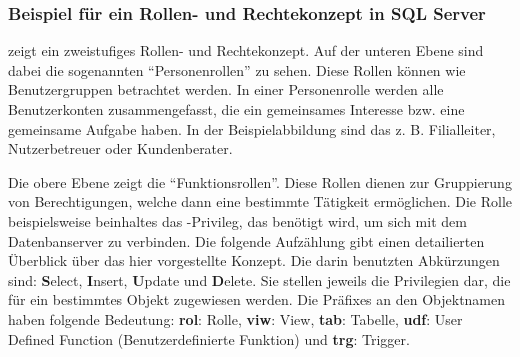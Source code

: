         \subsubsection{Beispiel für ein Rollen- und Rechtekonzept in SQL Server}
           zeigt ein zweistufiges Rollen- und
          Rechtekonzept. Auf der unteren Ebene sind dabei die sogenannten
          \enquote{Personenrollen} zu sehen. Diese Rollen können wie
          Benutzergruppen betrachtet werden. In einer Personenrolle werden alle
          Benutzerkonten zusammengefasst, die ein gemeinsames Interesse bzw.
          eine gemeinsame Aufgabe haben. In der Beispielabbildung sind das z. B.
          Filialleiter, Nutzerbetreuer oder Kundenberater.
          
          Die obere Ebene zeigt die \enquote{Funktionsrollen}. Diese Rollen
          dienen zur Gruppierung von Berechtigungen, welche dann eine bestimmte
          Tätigkeit ermöglichen. Die Rolle  beispielsweise
          beinhaltes das -Privileg, das benötigt wird, um
          sich mit dem Datenbanserver zu verbinden. Die folgende Aufzählung gibt
          einen detailierten Überblick über das hier vorgestellte Konzept. Die
          darin benutzten Abkürzungen sind: \textbf{S}elect, \textbf{I}nsert,
          \textbf{U}pdate und \textbf{D}elete. Sie stellen jeweils die
          Privilegien dar, die für ein bestimmtes Objekt zugewiesen werden. Die
          Präfixes an den Objektnamen haben folgende Bedeutung: \textbf{rol}:
          Rolle, \textbf{viw}: View, \textbf{tab}: Tabelle, \textbf{udf}:
          User Defined Function (Benutzerdefinierte Funktion) und \textbf{trg}:
          Trigger.
          
